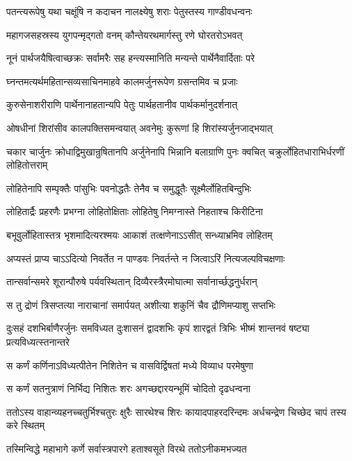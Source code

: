 \twolineshloka
{पतन्त्यरूपेषु यथा चक्षूंषि न कदाचन}
{नालक्ष्येषु शराः पेतुस्तस्य गाण्डीवधन्वनः}


\twolineshloka
{महागजसहस्रस्य युगपन्मृद्गतो वनम्}
{कौन्तेयरथमार्गस्तु रणे घोरतरोऽभवत्}


\twolineshloka
{नूनं पार्थजयैषित्वाच्छक्रः सर्वामरैः सह}
{हन्त्यस्मानिति मन्यन्ते पार्थेनैवार्दिताः परे}


\twolineshloka
{घ्नन्तमत्यर्थमहितान्सव्यसाचिनमाहवे}
{कालमर्जुनरूपेण ग्रसन्तमिव च प्रजाः}


\twolineshloka
{कुरुसेनाशरीराणि पार्थेनानाहतान्यपि}
{पेतुः पार्थहतानीव पार्थकर्मानुदर्शनात्}


\twolineshloka
{ओषधीनां शिरांसीव कालपक्तिसमन्वयात्}
{अवनेमुः कुरूणां हि शिरांस्यर्जुनजाद्भयात्}


\onelineshloka
{चकार चार्जुनः क्रोधाद्विमुखान्रुषितानपि}
\twolineshloka
{अर्जुनेनापि भिन्नानि बलाग्राणि पुनः क्वचित्}
{चक्रुर्लोहितधाराभिर्धरणीं लोहितोत्तराम्}


\twolineshloka
{लोहितेनापि सम्पृक्तैः पांसुभिः पवनोद्धतैः}
{तेनैव च समुद्धूतैः सूक्ष्मैर्लोहितबिन्दुभिः}


\twolineshloka
{लोहितार्द्रैः प्रहरणैः प्रभग्ना लोहितोक्षिताः}
{लोहितेषु निमग्नास्ते निहताश्च किरीटिना}


\twolineshloka
{बभूवुर्लोहितास्तत्र भृशमादित्यरश्मयः}
{आकाशं तत्क्षणेनाऽऽसीत् सन्ध्याभ्रमिव लोहितम्}


\twolineshloka
{अप्यस्तं प्राप्य चाऽऽदित्यो निवर्तेत न पाण्डवः}
{निवर्तन्ते न जित्वाऽरिं नित्यजल्पविचक्षणाः}


\twolineshloka
{तान्सर्वान्समरे शूरान्पौरुषे पर्यवस्थितान्}
{दिव्यैरस्त्रैरमोघात्मा सर्वानार्च्छद्धनुर्धरान्}


\twolineshloka
{स तु द्रोणं त्रिसप्तत्या नाराचानां समार्पयत्}
{अशीत्या शकुनिं चैव द्रौणिमप्याशु सप्तभिः}


\threelineshloka
{दुःसहं दशभिर्बाणैरर्जुनः समविध्यत}
{दुःशासनं द्वादशभिः कृपं शारद्वतं त्रिभिः}
{भीष्मं शान्तनवं षष्ट्या प्रत्यविध्यत्स्तनान्तरे}


\twolineshloka
{स कर्णं कर्णिनाऽविध्यत्पीतेन निशितेन च}
{वासविर्द्विषतां मध्ये विव्याध परमेषुणा}


\twolineshloka
{स कर्णं सतनुत्राणं निर्भिद्य निशितः शरः}
{अगच्छद्दारयन्भूमिं चोदितो दृढधन्वना}


\threelineshloka
{ततोऽस्य वाहान्व्यहनच्चतुर्भिश्चतुरः क्षुरैः}
{सारथेश्च शिरः कायादपाहरदरिन्दमः}
{अर्धचन्द्रेण चिच्छेद चापं तस्य करे स्थितम्}


\twolineshloka
{तस्मिन्विद्धे महाभागे कर्णे सर्वास्त्रपारगे}
{हताश्वसूते विरथे ततोऽनीकमभज्यत}

